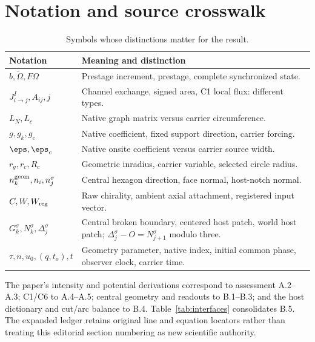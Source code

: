 \appendix
\section{Notation and source crosswalk}
\begin{table}[htbp]\centering\small
\caption{Symbols whose distinctions matter for the result.}
\begin{tabularx}{\textwidth}{@{}p{}Y@{}}\toprule
Notation & Meaning and distinction\\\midrule
$b,\widetilde\Omega,F\Omega$ & Prestage increment, prestage, complete synchronized state.\\
$J^I_{i\to j},A_{ij},j$ & Channel exchange, signed area, C1 local flux: different types.\\
$L_N,L_c$ & Native graph matrix versus carrier circumference.\\
$g,g_k,g_c$ & Native coefficient, fixed support direction, carrier forcing.\\
$\eps,\eps_c$ & Native onsite coefficient versus carrier source width.\\
$r_g,r_c,R_c$ & Geometric inradius, carrier variable, selected circle radius.\\
$n_k^{\rm geom},n_i,n_j^\sigma$ & Central hexagon direction, face normal, host-notch normal.\\
$C,W,W_{\rm reg}$ & Raw chirality, ambient axial attachment, registered input vector.\\
$G_k^\sigma,N_k^\sigma,\Delta_j^\sigma$ & Central broken boundary, centered host patch, world host patch; $\Delta_j^\sigma-O=N_{j+1}^\sigma$ modulo three.\\
$\tau,n,u_0,(q,t_o),t$ & Geometry parameter, native index, initial common phase, observer clock, carrier time.\\\bottomrule
\end{tabularx}
\end{table}
The paper's intensity and potential derivations correspond to assessment A.2--A.3; C1/C6 to A.4--A.5; central geometry and readouts to B.1--B.3; and the host dictionary and cut/arc balance to B.4. Table~\ref{tab:interfaces} consolidates B.5. The expanded ledger retains original line and equation locators rather than treating this editorial section numbering as new scientific authority.
